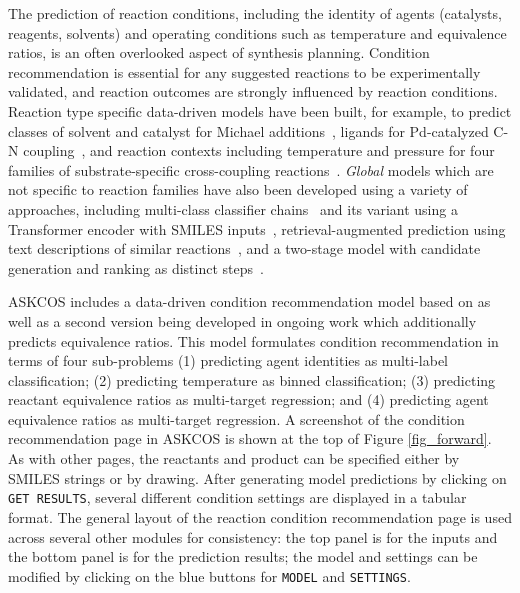 \documentclass[pdflatex,sn-mathphys-num]{sn-jnl}%
\theoremstyle{thmstyleone}%
\theoremstyle{thmstyletwo}%
\theoremstyle{thmstylethree}%
\begin{document}

The prediction of reaction conditions, including the identity of agents (catalysts, reagents, solvents) and operating conditions such as temperature and equivalence ratios, is an often overlooked aspect of synthesis planning. Condition recommendation is essential for any suggested reactions to be experimentally validated, and reaction outcomes are strongly influenced by reaction conditions. Reaction type specific data-driven models have been built, for example, to predict classes of solvent and catalyst for Michael additions~\citep{marcou_expert_2015}, ligands for Pd-catalyzed C-N coupling~\citep{li_making_2019}, and reaction contexts including temperature and pressure for four families of substrate-specific cross-coupling reactions~\citep{maser_multilabel_2021,kwon_generative_2022}. \emph{Global} models which are not specific to reaction families have also been developed using a variety of approaches, including multi-class classifier chains~\citep{gao_using_2018} and its variant using a Transformer encoder with SMILES inputs~\citep{wang_generic_2023},  retrieval-augmented prediction using text descriptions of similar reactions~\citep{qian_predictive_2023}, and a two-stage model with candidate generation and ranking as distinct steps~\citep{chen_enhancing_2024}. 


ASKCOS includes a data-driven condition recommendation model based on \citet{gao_using_2018} as well as a second version being developed in ongoing work which additionally predicts equivalence ratios. This model formulates condition recommendation in terms of four sub-problems (1) predicting agent identities as multi-label classification; (2) predicting temperature as binned classification; (3) predicting reactant equivalence ratios as multi-target regression; and (4) predicting agent equivalence ratios as multi-target regression. A screenshot of the condition recommendation page in ASKCOS is shown at the top of Figure \ref{fig_forward}. As with other pages, the reactants and product can be specified either by SMILES strings or by drawing. After generating model predictions by clicking on \texttt{GET RESULTS}, several different condition settings are displayed in a tabular format. The general layout of the reaction condition recommendation page is used across several other modules for consistency: the top panel is for the inputs and the bottom panel is for the prediction results; the model and settings can be modified by clicking on the blue buttons for \texttt{MODEL} and \texttt{SETTINGS}.
\end{document}
